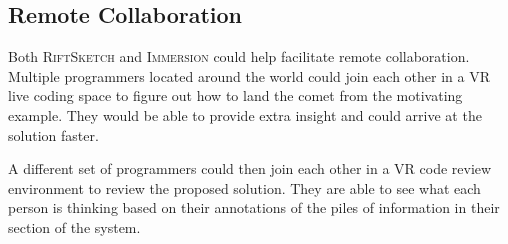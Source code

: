 \documentclass[conference]{IEEEtran}
\begin{document}
\subsection{Remote Collaboration}

Both \textsc{RiftSketch} and \textsc{Immersion} could help facilitate remote collaboration.
Multiple programmers located around the world could join each other in a VR live coding space to figure out how to land the comet from the motivating example.
They would be able to provide extra insight and could arrive at the solution faster.

A different set of programmers could then join each other in a VR code review environment to review the proposed solution.
They are able to see what each person is thinking based on their annotations of the piles of information in their section of the system.





\end{document}
